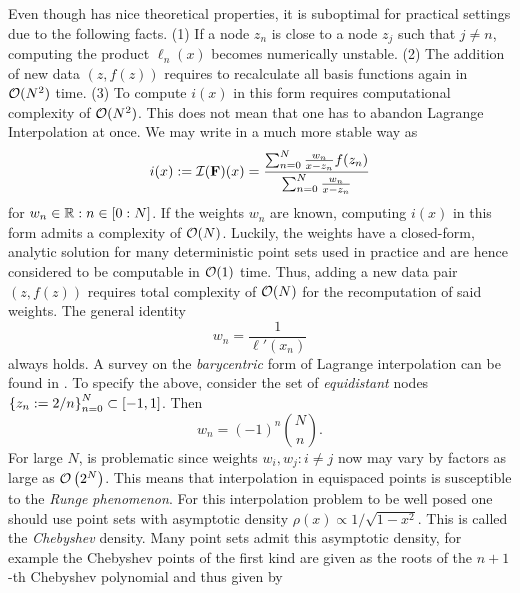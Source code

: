 \documentclass[12pt, oneside]{amsart}
\theoremstyle{definition}
\theoremstyle{remark}
\numberwithin{equation}{section}
\begin{document}
Even though  has nice theoretical properties, 
it is suboptimal for practical settings due to the following facts. (1) If a 
node \(z_n\) is close to a node \(z_j\) such that \(j \neq n\), computing the 
product \(\ell_n(x)\) becomes numerically unstable. (2) The addition of new 
data \(\left(z, f(z)\right)\) requires to recalculate all basis functions again 
in \(\cO(N^2)\) time. (3) To compute \(i(x)\) in this form requires 
computational complexity of \(\cO(N^2)\). This does not mean that one has to 
abandon Lagrange Interpolation at once. We may write 
 in a much more stable way as
\begin{equation}\label{eq:barycentricLagrange}
    i(x) \defn \cI(\FF)(x) = \frac{\sum_{n=0}^N \frac{w_n}{x-z_n} f(z_n)}{\sum_{n=0}^N \frac{w_n}{x-z_n}}
\end{equation}
for \(w_n \in \R : n \in \indexset[0]{N}\). If the weights \(w_n\) are known, 
computing 
\(i(x)\) in this form admits a complexity of \(\cO(N)\). Luckily, the weights 
have a closed-form, analytic solution for many deterministic point sets used in 
practice and are hence considered to be computable in \(\cO(1)\) time. Thus, 
adding a new data pair \((z, f(z))\) requires total complexity of \(\cO(N)\) 
for the recomputation of said weights. The general identity
 \[
    w_n = \frac{1}{\ell'(x_n)}
\]
always holds. A survey on the \emph{barycentric} form of Lagrange interpolation can be found in \cite{Berut_2004}. To specify the above, consider the set of \emph{equidistant} 
nodes \(\set{z_n \defn 2/n}_{n=0}^{N} \subset [-1, 1]\). Then 
\begin{equation}\label{eq:weightsEquidistant}
    w_n = {\left(-1\right)}^n \binom{N}{n}.
\end{equation}
For large \(N\),  is problematic since weights 
\(w_i, w_j: i \neq j\) now may vary by factors as large as 
\(\cO\left(2^N\right)\). This means that interpolation in equispaced points is 
susceptible to the \emph{Runge phenomenon}. For this interpolation problem to 
be well posed one should use point sets with asymptotic density \(\rho(x) 
\propto 1/\sqrt{1-x^2}\). This is called the \emph{Chebyshev} density.\newline 
Many point sets admit this asymptotic density, for 
example the Chebyshev points of the first kind are given as the roots of the 
$n+1$-th Chebyshev polynomial and thus given by
\end{document}
